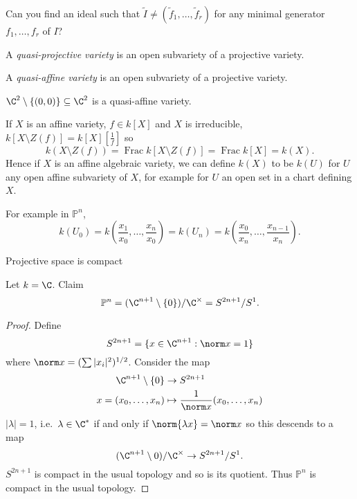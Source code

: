 \documentclass[a4paper]{article}
\renewcommand*{\P}{\mathbb{P}}
\begin{document}
\begin{ex}
  Can you find an ideal such that \(\tilde I \neq (\tilde f_1, \dots, \tilde f_r)\) for any minimal generator \(f_1, \dots, f_r\) of \(I\)?
\end{ex}

\begin{definition}
  A \emph{quasi-projective variety} is an open subvariety of a projective variety.

  A \emph{quasi-affine variety} is an open subvariety of a projective variety.
\end{definition}

\begin{eg}
  \(\C^2 \setminus \{(0, 0)\} \subseteq \C^2\) is a quasi-affine variety.
\end{eg}

\begin{remark}
  If \(X\) is an affine variety, \(f \in k[X]\) and \(X\) is irreducible, \(k[X \setminus Z(f)] = k[X][\frac{1}{f}]\) so
  \[
    k(X \setminus Z(f)) = \operatorname{Frac} k[X \setminus Z(f)] = \operatorname{Frac} k[X] = k(X).
  \]
  Hence if \(X\) is an affine algebraic variety, we can define \(k(X)\) to be \(k(U)\) for \(U\) any open affine subvariety of \(X\), for example for \(U\) an open set in a chart defining \(X\).

  For example in \(\P^n\),
  \[
    k(U_0)
    = k(\frac{x_1}{x_0}, \dots, \frac{x_n}{x_0})
    = k(U_n)
    = k(\frac{x_0}{x_n}, \dots, \frac{x_{n - 1}}{x_n}).
  \]
\end{remark}

Projective space is compact

Let \(k = \C\). Claim
\[
  \P^n = (\C^{n + 1} \setminus \{0\}) / \C^\times = S^{2n + 1}/S^1.
\]

\begin{proof}
  Define
  \[
    S^{2n + 1} = \{x \in \C^{n + 1}: \norm x = 1\}
  \]
  where \(\norm x = (\sum |x_i|^2)^{1/2}\). Consider the map
  \begin{align*}
    \C^{n + 1} \setminus \{0\} &\to S^{2n + 1} \\
    x = (x_0, \dots, x_n) &\mapsto \frac{1}{\norm x} (x_0, \dots, x_n)
  \end{align*}
  \(|\lambda| = 1\), i.e.\ \(\lambda \in \C^*\) if and only if \(\norm{\lambda x} = \norm x\) so this descends to a map
  \[
    (\C^{n + 1} \setminus 0)/ \C^\times \to S^{2n + 1}/S^1.
  \]
  \(S^{2n + 1}\) is compact in the usual topology and so is its quotient. Thus \(\P^n\) is compact in the usual topology.
\end{proof}
\end{document}
